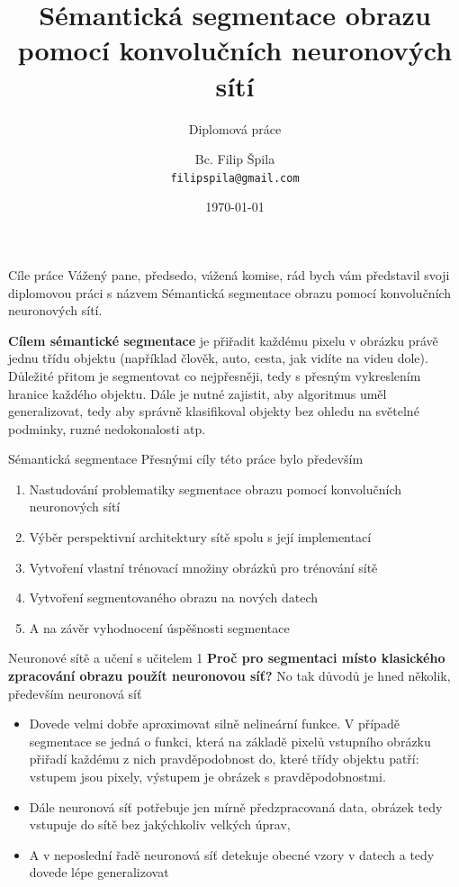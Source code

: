 \documentclass[aspectratio=1610]{beamer}
\title[Sémantická segmentace obrazu pomocí CNN]
{Sémantická segmentace obrazu pomocí konvolučních neuronových sítí}
\subtitle
{Diplomová práce}
\author[Bc. Filip Špila]
{Bc. Filip Špila \\
	\texttt{filipspila@gmail.com}}
\institute
{Ústav mechaniky těles, mechatroniky a biomechaniky \\
	Vysoké učení technické v Brně
}
\date{\today}
\begin{document}
	
	
	\begin{frame}
	\titlepage
	\end{frame}
\begin{frame}{Cíle práce}
Vážený pane, předsedo, vážená komise, rád bych vám představil svoji diplomovou práci s názvem Sémantická segmentace obrazu pomocí konvolučních neuronových sítí. 

\textbf{Cílem sémantické segmentace} je přiřadit každému pixelu v obrázku právě jednu třídu objektu (například člověk, auto, cesta, jak vidíte na videu dole). Důležité přitom je segmentovat co nejpřesněji, tedy s přesným vykreslením hranice každého objektu. Dále je nutné zajistit, aby algoritmus uměl generalizovat, tedy aby správně klasifikoval objekty bez ohledu na světelné podminky, ruzné nedokonalosti atp.
\end{frame}
\begin{frame}{Sémantická segmentace}
Přesnými cíly této práce bylo především
\begin{enumerate}
	\item Nastudování problematiky segmentace obrazu pomocí konvolučních neuronových sítí
	\item Výběr perspektivní architektury sítě spolu s její implementací
	\item Vytvoření vlastní trénovací množiny obrázků pro trénování sítě
	\item Vytvoření segmentovaného obrazu na nových datech
	\item A na závěr vyhodnocení úspěšnosti segmentace
\end{enumerate}	
\end{frame}
\begin{frame}{Neuronové sítě a učení s učitelem 1}
	\textbf{Proč pro segmentaci místo klasického zpracování obrazu použít neuronovou síť?} No tak důvodů je hned několik, především neuronová síť
	\begin{itemize}
		\item Dovede velmi dobře aproximovat silně nelineární funkce. V případě segmentace se jedná o funkci, která na základě pixelů vstupního obrázku přiřadí každému z nich pravděpodobnost do, které třídy objektu patří: vstupem jsou pixely, výstupem je obrázek s pravděpodobnostmi.
		\item Dále neuronová síť potřebuje jen mírně předzpracovaná data, obrázek tedy vstupuje do sítě bez jakýchkoliv velkých úprav,
		\item A v neposlední řadě neuronová síť detekuje obecné vzory v datech a tedy dovede lépe generalizovat	
	\end{itemize}
\end{frame}	
\end{document}

